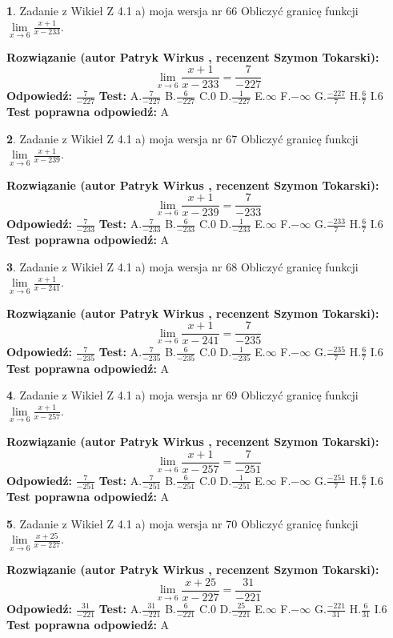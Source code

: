 \documentclass[12pt, a4paper]{article}
\theoremstyle{definition} %
\newtheorem{zad}{}
\newcommand{\zadStart}[1]{\begin{zad}#1\newline}
\newcommand{\zadStop}{\end{zad}}
\newcommand{\rozwStart}[2]{\noindent \textbf{Rozwiązanie (autor #1 , recenzent #2): }\newline}
\newcommand{\rozwStop}{\newline}
\newcommand{\odpStart}{\noindent \textbf{Odpowiedź:}\newline}
\newcommand{\odpStop}{\newline}
\newcommand{\testStart}{\noindent \textbf{Test:}\newline}
\newcommand{\testStop}{\newline}
\newcommand{\kluczStart}{\noindent \textbf{Test poprawna odpowiedź:}\newline}
\newcommand{\kluczStop}{\newline}
\begin{document}
\zadStart{Zadanie z Wikieł Z 4.1 a) moja wersja nr 66}
Obliczyć granicę funkcji $\lim\limits_{x\to6}\frac{x+1}{x-233}$.
\zadStop
\rozwStart{Patryk Wirkus}{Szymon Tokarski}
$$\lim\limits_{x\to6}\frac{x+1}{x-233} = \frac{7}{-227}$$
\rozwStop
\odpStart
$\frac{7}{-227}$
\odpStop
\testStart
A.$\frac{7}{-227}$
B.$\frac{6}{-227}$
C.$0$
D.$\frac{1}{-227}$
E.$\infty$
F.$-\infty$
G.$\frac{-227}{7}$
H.$\frac{6}{7}$
I.$6$
\testStop
\kluczStart
A
\kluczStop



\zadStart{Zadanie z Wikieł Z 4.1 a) moja wersja nr 67}
Obliczyć granicę funkcji $\lim\limits_{x\to6}\frac{x+1}{x-239}$.
\zadStop
\rozwStart{Patryk Wirkus}{Szymon Tokarski}
$$\lim\limits_{x\to6}\frac{x+1}{x-239} = \frac{7}{-233}$$
\rozwStop
\odpStart
$\frac{7}{-233}$
\odpStop
\testStart
A.$\frac{7}{-233}$
B.$\frac{6}{-233}$
C.$0$
D.$\frac{1}{-233}$
E.$\infty$
F.$-\infty$
G.$\frac{-233}{7}$
H.$\frac{6}{7}$
I.$6$
\testStop
\kluczStart
A
\kluczStop



\zadStart{Zadanie z Wikieł Z 4.1 a) moja wersja nr 68}
Obliczyć granicę funkcji $\lim\limits_{x\to6}\frac{x+1}{x-241}$.
\zadStop
\rozwStart{Patryk Wirkus}{Szymon Tokarski}
$$\lim\limits_{x\to6}\frac{x+1}{x-241} = \frac{7}{-235}$$
\rozwStop
\odpStart
$\frac{7}{-235}$
\odpStop
\testStart
A.$\frac{7}{-235}$
B.$\frac{6}{-235}$
C.$0$
D.$\frac{1}{-235}$
E.$\infty$
F.$-\infty$
G.$\frac{-235}{7}$
H.$\frac{6}{7}$
I.$6$
\testStop
\kluczStart
A
\kluczStop



\zadStart{Zadanie z Wikieł Z 4.1 a) moja wersja nr 69}
Obliczyć granicę funkcji $\lim\limits_{x\to6}\frac{x+1}{x-257}$.
\zadStop
\rozwStart{Patryk Wirkus}{Szymon Tokarski}
$$\lim\limits_{x\to6}\frac{x+1}{x-257} = \frac{7}{-251}$$
\rozwStop
\odpStart
$\frac{7}{-251}$
\odpStop
\testStart
A.$\frac{7}{-251}$
B.$\frac{6}{-251}$
C.$0$
D.$\frac{1}{-251}$
E.$\infty$
F.$-\infty$
G.$\frac{-251}{7}$
H.$\frac{6}{7}$
I.$6$
\testStop
\kluczStart
A
\kluczStop



\zadStart{Zadanie z Wikieł Z 4.1 a) moja wersja nr 70}
Obliczyć granicę funkcji $\lim\limits_{x\to6}\frac{x+25}{x-227}$.
\zadStop
\rozwStart{Patryk Wirkus}{Szymon Tokarski}
$$\lim\limits_{x\to6}\frac{x+25}{x-227} = \frac{31}{-221}$$
\rozwStop
\odpStart
$\frac{31}{-221}$
\odpStop
\testStart
A.$\frac{31}{-221}$
B.$\frac{6}{-221}$
C.$0$
D.$\frac{25}{-221}$
E.$\infty$
F.$-\infty$
G.$\frac{-221}{31}$
H.$\frac{6}{31}$
I.$6$
\testStop
\kluczStart
A
\kluczStop
\end{document}
